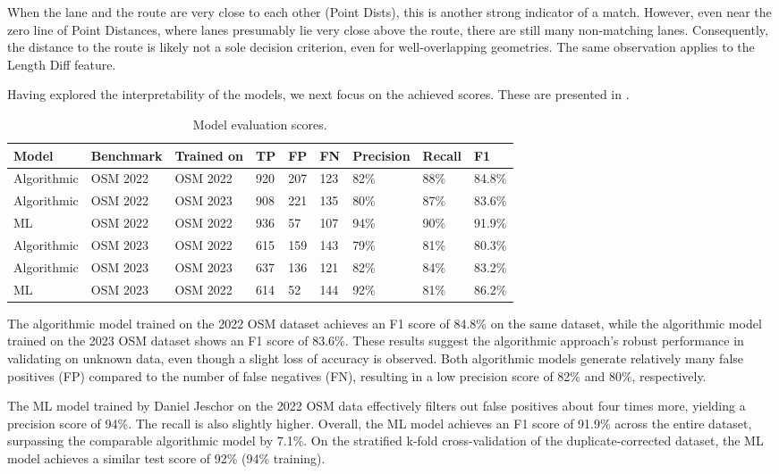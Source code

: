 When the lane and the route are very close to each other (Point Dists), this is another strong indicator of a match. However, even near the zero line of Point Distances, where lanes presumably lie very close above the route, there are still many non-matching lanes. Consequently, the distance to the route is likely not a sole decision criterion, even for well-overlapping geometries. The same observation applies to the Length Diff feature.

Having explored the interpretability of the models, we next focus on the achieved scores. These are presented in .

\begin{table}[ht]
\caption{Model evaluation scores.}
\begin{tabular}{@{}lllllllll@{}}
\toprule
  \textbf{Model} & \textbf{Benchmark} & \textbf{Trained on} & \textbf{TP} & \textbf{FP} & \textbf{FN} & \textbf{Precision} & \textbf{Recall} & \textbf{F1} \\
  \midrule
  Algorithmic & OSM 2022 & OSM 2022 & 920 & 207 & 123 & 82\% & 88\% & 84.8\% \\
  Algorithmic & OSM 2022 & OSM 2023 & 908 & 221 & 135 & 80\% & 87\% & 83.6\% \\
  ML          & OSM 2022 & OSM 2022 & 936 & 57 & 107 & 94\% & 90\% & 91.9\% \\
  \midrule
  Algorithmic & OSM 2023 & OSM 2022 & 615 & 159 & 143 & 79\% & 81\% & 80.3\% \\
  Algorithmic & OSM 2023 & OSM 2023 & 637 & 136 & 121 & 82\% & 84\% & 83.2\% \\
  ML          & OSM 2023 & OSM 2022 & 614 & 52 & 144 & 92\% & 81\% & 86.2\% \\
\bottomrule
\end{tabular}
\label{tab:model-scores}
\end{table}

The algorithmic model trained on the 2022 OSM dataset achieves an F1 score of 84.8\% on the same dataset, while the algorithmic model trained on the 2023 OSM dataset shows an F1 score of 83.6\%. These results suggest the algorithmic approach's robust performance in validating on unknown data, even though a slight loss of accuracy is observed. Both algorithmic models generate relatively many false positives (FP) compared to the number of false negatives (FN), resulting in a low precision score of 82\% and 80\%, respectively.

The ML model trained by Daniel Jeschor \cite{jeschor_2022} on the 2022 OSM data effectively filters out false positives about four times more, yielding a precision score of 94\%. The recall is also slightly higher. Overall, the ML model achieves an F1 score of 91.9\% across the entire dataset, surpassing the comparable algorithmic model by 7.1\%. On the stratified k-fold cross-validation of the duplicate-corrected dataset, the ML model achieves a similar test score of 92\% (94\% training).

